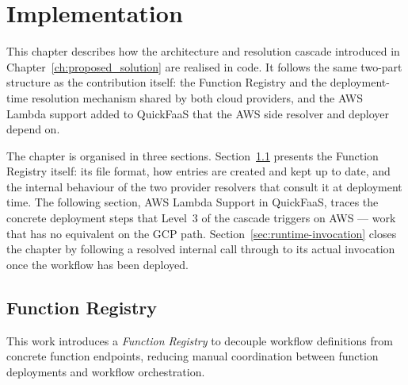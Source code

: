% 
%  
%
\chapter{Implementation}
\label{cha:impl}

This chapter describes how the architecture and resolution cascade introduced in
Chapter~\ref{ch:proposed_solution} are realised in code. It follows the same two-part structure
as the contribution itself: the Function Registry and the deployment-time resolution mechanism
shared by both cloud providers, and the AWS Lambda support added to QuickFaaS that the
AWS side resolver and deployer depend on.

The chapter is organised in three sections. Section~\ref{sec:function-registry} presents the
Function Registry itself: its file format, how entries are created and kept up to date, and the
internal behaviour of the two provider resolvers that consult it at deployment time. The
following section, AWS Lambda Support in QuickFaaS, traces the concrete deployment steps that
Level~3 of the cascade triggers on AWS --- work that has no equivalent on the GCP path.
Section~\ref{sec:runtime-invocation} closes the chapter by following a resolved internal call
through to its actual invocation once the workflow has been deployed.

\section{Function Registry}
\label{sec:function-registry}

This work introduces a \textit{Function Registry} to decouple workflow definitions from concrete function endpoints, reducing manual coordination between function deployments and workflow orchestration.

